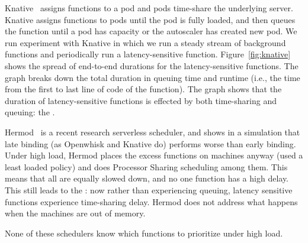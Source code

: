 Knative~\cite{knative} assigns functions to a pod and pods time-share
the underlying server. Knative assigns functions to pods until the pod
is fully loaded, and then queues the function until a pod has capacity
or the autoscaler has created new pod.  We run experiment with Knative
in which we run a steady stream of background functions and
periodically run a latency-sensitive
function. Figure~\ref{fig:knative} shows the spread of end-to-end
durations for the latency-sensitive functions.  The graph breaks down
the total duration in queuing time and runtime (i.e., the time from
the first to last line of code of the function).  The graph shows that
the duration of latency-sensitive functions is effected by both
time-sharing and queuing: the \problem{}.



Hermod~\cite{hermod} is a recent research serverless scheduler, and shows in a
simulation that late binding (as Openwhisk and Knative do) performs worse than
early binding. Under high load, Hermod places the excess functions on machines
anyway (used a least loaded policy) and does Processor Sharing scheduling among
them. This means that all are equally slowed down, and no one function has a
high delay. This still leads to the \problem{}: now rather than experiencing
queuing, latency sensitive functions experience time-sharing delay. Hermod does not
address what happens when the machines are out of memory. 


None of these schedulers 
know which functions to prioritize under high load.





